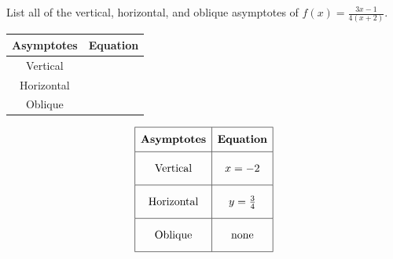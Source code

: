 \documentclass[addpoints]{exam}
\begin{document}
\begin{questions}
\newpage
\newpage

\question[5] List all of the vertical, horizontal, and oblique asymptotes of \(\displaystyle{ f(x) = \displaystyle{\frac{3x - 1}{4(x + 2)}} }\).\\
\begin{center}
\renewcommand{\arraystretch}{3}
    \begin{tabular}{|c|c|}
        \hline
        \textbf{Asymptotes}  & \textbf{Equation} \\ \hline
        Vertical   & \hspace{50mm} \\ \hline
        Horizontal &  \\ \hline
        Oblique    &  \\ \hline
    \end{tabular}
\end{center}
\begin{solution}
\[\begin{array}{|c|c|} \hline \rule[-0.8em]{0pt}{2.2em} \textbf{Asymptotes} & \textbf{Equation} \\ \hline \rule[-1.2em]{0pt}{3em} \text{Vertical} & x = -2 \\ \hline \rule[-1.2em]{0pt}{3em} \text{Horizontal} & y = \frac{3}{4} \\ \hline \rule[-1.2em]{0pt}{3em} \text{Oblique} & \text{none} \\ \hline \end{array}\]
\end{solution}


\end{questions}
\end{document}
